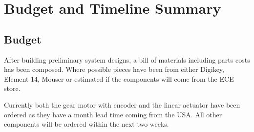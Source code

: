 \chapter{Budget and Timeline Summary}

\section{Budget}
After building preliminary system designs, a bill of materials including parts
costs has been composed. Where possible pieces have been from either Digikey,
Element 14, Mouser or estimated if the components will come from the ECE store.

Currently both the gear motor with encoder and the linear actuator have been
ordered as they have a month lead time coming from the USA. All other components
will be ordered within the next two weeks.

